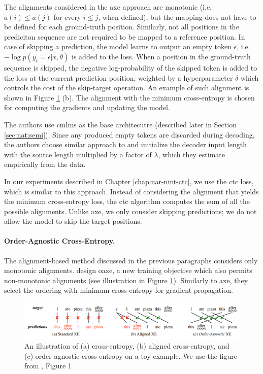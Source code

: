 The alignments considered in the \ac{axe} approach are monotonic (i.e.
$a(i) \leq a(j)$ for every $i \leq j$, when defined), but the mapping does not
have to be defined for each ground-truth position. Similarly, not all positions
in the prediciton sequence are not required to be mapped to a reference
position.  In case of skipping a prediction, the model learns to output an
empty token $\epsilon$, i.e. $-\log p(y_t = \epsilon | x, \theta)$ is added to
the loss.  When a position in the ground-truth sequence is skipped, the
negative log-probability of the skipped token is added to the loss at the
current prediction position, weighted by a hyperparameter $\delta$ which
controls the cost of the skip-target operation. An example of such alignment is
shown in Figure \ref{fig:oaxe-example} (b). The alignment with the minimum
cross-entropy is chosen for computing the gradients and updating the model.

The authors use \aclp{cmlm} as the base architecutre (described later in
Section \ref{sec:nat:semi}).  Since any produced empty tokens are discarded
during decoding, the authors choose similar approach to
\citet{libovicky-helcl-2018-end} and initialize the decoder input length with
the source length multiplied by a factor of $\lambda$, which they estimate
empirically from the data. 

In our experiments described in Chapter \ref{chap:nar-nmt-ctc}, we use the
\ac{ctc} loss, which is similar to this approach. Instead of considering the
alignment that yields the minimum cross-entropy loss, the \ac{ctc} algorithm
computes the sum of all the possible alignments. Unlike \ac{axe}, we only
consider skipping predictions; we do not allow the model to skip the target
positions.

\paragraph{Order-Agnostic Cross-Entropy.} The alignment-based method discussed
in the previous paragraphs considers only monotonic
alignments. \citet{du2021orderagnostic} design \ac{oaxe}, a new training
objective which also permits non-monotonic alignments (see illustration in
Figure \ref{fig:oaxe-example}). Similarly to \ac{axe}, they select the ordering
with minimum cross-entropy for gradient propagation.

\begin{figure}
  \centering
  \includegraphics[width=\textwidth]{img/oaxe.png}

  \caption{An illustration of (a) cross-entropy, (b) aligned cross-entropy, and
    (c) order-agnostic cross-entropy on a toy example. We use the figure from
    \citet{du2021orderagnostic}, Figure 1}%
  \label{fig:oaxe-example}
\end{figure}

